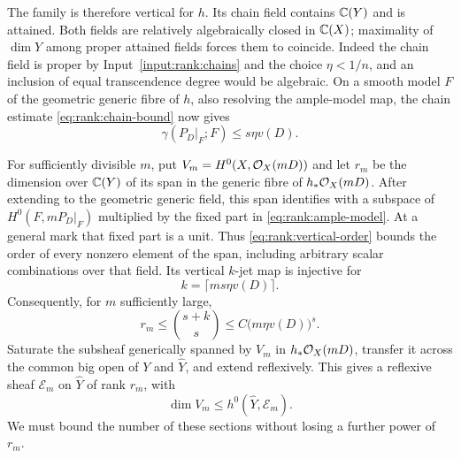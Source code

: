 The family is therefore vertical for $h$.  Its chain field contains
$\mathbb C(Y)$ and is attained.  Both fields are relatively algebraically
closed in $\mathbb C(X)$; maximality of $\dim Y$ among proper attained fields
forces them to coincide.  Indeed the chain field is proper by
Input~\ref{input:rank:chains} and the choice $\eta<1/n$, and an inclusion
of equal transcendence degree would be algebraic.  On a smooth model
$F$ of the geometric generic fibre of $h$, also resolving the ample-model
map, the chain estimate \eqref{eq:rank:chain-bound} now gives
\begin{equation}\label{eq:rank:vertical-order}
  \gamma(P_D|_F;F)\le s\eta v(D).
\end{equation}

For sufficiently divisible $m$, put $V_m=H^0(X,\mathcal O_X(mD))$ and let $r_m$
be the dimension over $\mathbb C(Y)$ of its span in the generic fibre of
$h_*\mathcal O_X(mD)$.  After extending to the geometric generic field, this
span identifies with a subspace of $H^0(F,mP_D|_F)$ multiplied by the
fixed part in \eqref{eq:rank:ample-model}.  At a general mark that fixed
part is a unit.  Thus \eqref{eq:rank:vertical-order} bounds the order of
every nonzero element of the span, including arbitrary scalar
combinations over that field.  Its vertical $k$-jet map is injective for
\[
  k=\lceil ms\eta v(D)\rceil.
\]
Consequently, for $m$ sufficiently large,
\begin{equation}\label{eq:rank:vertical-rank}
  r_m\le {s+k\choose s}\le C\bigl(m\eta v(D)\bigr)^s.
\end{equation}
Saturate the subsheaf generically spanned by $V_m$ in $h_*\mathcal O_X(mD)$,
transfer it across the common big open of $Y$ and $\widehat Y$, and extend
reflexively.  This gives a reflexive sheaf $\mathcal E_m$ on
$\widehat Y$ of rank $r_m$, with
\begin{equation}\label{eq:rank:sections-in-span}
  \dim V_m\le h^0(\widehat Y,\mathcal E_m).
\end{equation}
We must bound the number of these sections without losing a further
power of $r_m$.

